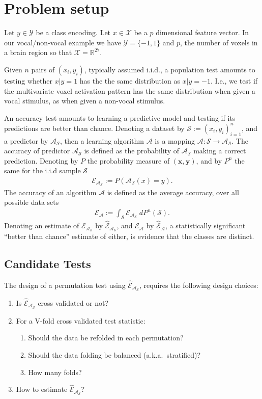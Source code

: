 \documentclass[12pt,a4paper]{article}
\theoremstyle{definition}
\newcommand{\set}[1]{\{ #1 \}} %
\newcommand{\reals}{\mathbb{R}} %
\newcommand{\features}{x} %
\newcommand{\outcomes}{y} %
\newcommand{\featureS}{\mathcal{X}} %
\newcommand{\outcomeS}{\mathcal{Y}} %
\newcommand{\acc}{\mathcal{E}}
\newcommand{\accEstim}{\hat{\mathcal{E}}}
\newcommand{\hyp}{\algo_\data} %
\newcommand{\rv}[1]{\mathbf{#1}} %
\newcommand{\x}{\rv x} %
\newcommand{\y}{\rv y} %
\newcommand{\algo}{\mathcal{A}}
\newcommand{\data}{\mathcal{S}}
\newcommand{\measure}{P}
\newcommand{\measuren}{P^n}
\begin{document}
\section{Problem setup}
\label{sec:problem_setup}

Let $\outcomes \in \outcomeS$ be a class encoding. 
Let $\features \in \featureS$ be a $p$ dimensional feature vector. 
In our vocal/non-vocal example we have $\outcomeS=\set{-1,1}$ and $p$, the number of voxels in a brain region so that $\featureS=\reals^{27}$. 

Given $n$ pairs of $(\features_i,\outcomes_i)$, typically assumed i.i.d., a population test amounts to testing whether $\features|\outcomes=1$ has the the same distribution as $\features|\outcomes=-1$. 
I.e., we test if the multivariate voxel activation pattern has the same distribution when given a vocal stimulus, as when given a non-vocal stimulus. 

An accuracy test amounts to learning a predictive model and testing if its predictions are better than chance. 
Denoting a dataset by $\data:=(\features_i,\outcomes_i)_{i=1}^n$, and a predictor by $\hyp$, then a learning algorithm $\algo$ is a mapping $\algo:\data \to \hyp$. 
The accuracy of predictor $\hyp$ is defined as the probability of $\hyp$ making a correct prediction.
Denoting by $\measure$ the probability measure of $(\x,\y)$, and by $\measuren$ the same for the i.i.d sample $\data$
\begin{align}
	\acc_{\hyp}:=\measure(\algo_\data(x)=y).
\end{align}
The accuracy of an algorithm $\algo$ is defined as the average accuracy, over all possible data sets
\begin{align}
	\acc_{\algo}:=\int_\data \acc_{\algo_\data} \; d\measuren(\data).
\end{align}
Denoting an estimate of $\acc_{\algo_\data}$ by $\accEstim_{\algo_\data}$, and $\acc_{\algo}$ by $\accEstim_{\algo}$, 
a statistically significant ``better than chance'' estimate of either,  is evidence that the classes are distinct. 


\subsection{Candidate Tests}
\label{sec:considerations}

The design of a permutation test using $\accEstim_{\hyp}$, requires the following design choices: 
\begin{enumerate}
\item Is $\accEstim_{\hyp}$ cross validated or not?
\item For a V-fold cross validated test statistic:
\begin{enumerate}
\item Should the data be refolded in each permutation? 
\item Should the data folding be balanced (a.k.a.\ stratified)?
\item How many folds? 
\end{enumerate}
\item How to estimate $\accEstim_{\hyp}$?
\end{enumerate}
\end{document}
